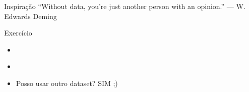 \begin{frame}
	\begin{block}{Inspiração}
		``Without data, you’re just another person with an opinion.'' — W. Edwards Deming
	\end{block}
\end{frame}


\begin{frame}
	\begin{block}{Exercício}
		\begin{itemize}
			\item \href{https://www.kaggle.com/datasets}{\color{blue}{Kaggle}}
			\item \href{https://archive.ics.uci.edu/ml/index.php}{\color{blue}{UCI}} 
			\item Posso usar outro dataset? SIM ;)
		\end{itemize}
	\end{block}
\end{frame}
